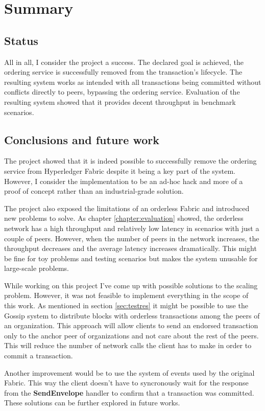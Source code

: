 \chapter{Summary} \label{chapter:summary}

\section{Status}
\label{sec:status}

All in all, I consider the project a success. The declared goal is achieved, the ordering service is successfully removed from the transaction's lifecycle. The resulting system works as intended with all transactions being committed without conflicts directly to peers, bypassing the ordering service. Evaluation of the resulting system showed that it provides decent throughput in benchmark scenarios.

\section{Conclusions and future work}
\label{sec:conclusions}

The project showed that it is indeed possible to successfully remove the ordering service from Hyperledger Fabric despite it being a key part of the system. However, I consider the implementation to be an ad-hoc hack and more of a proof of concept rather than an industrial-grade solution.

The project also exposed the limitations of an orderless Fabric and introduced new problems to solve. As chapter \ref{chapter:evaluation} showed, the orderless network has a high throughput and relatively low latency in scenarios with just a couple of peers. However, when the number of peers in the network increases, the throughput decreases and the average latency increases dramatically. This might be fine for toy problems and testing scenarios but makes the system unusable for large-scale problems.

While working on this project I've come up with possible solutions to the scaling problem. However, it was not feasible to implement everything in the scope of this work. As mentioned in section \ref{sec:testres} it might be possible to use the Gossip system to distribute blocks with orderless transactions among the peers of an organization. This approach will allow clients to send an endorsed transaction only to the anchor peer of organizations and not care about the rest of the peers. This will reduce the number of network calls the client has to make in order to commit a transaction.

Another improvement would be to use the system of events used by the original Fabric. This way the client doesn't have to syncronously wait for the response from the \textbf{SendEnvelope} handler to confirm that a transaction was committed. These solutions can be further explored in future works.
